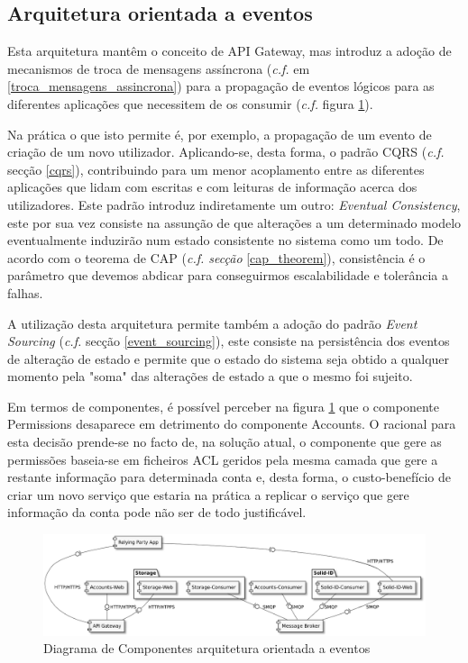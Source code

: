 \subsection{Arquitetura orientada a eventos} \label{subsection:arquitetura_2}

Esta arquitetura mantêm o conceito de API Gateway, mas introduz a adoção de mecanismos de troca de mensagens assíncrona (\emph{c.f.} em \ref{troca_mensagens_assincrona}) para a propagação de eventos lógicos para as diferentes aplicações que necessitem de os consumir (\emph{c.f.} figura \ref{component_diagram_arquitetura2}).

Na prática o que isto permite é, por exemplo, a propagação de um evento de criação de um novo utilizador. Aplicando-se, desta forma, o padrão CQRS (\emph{c.f.} secção \ref{cqrs}), contribuindo para um menor acoplamento entre as diferentes aplicações que lidam com escritas e com leituras de informação acerca dos utilizadores. Este padrão introduz indiretamente um outro: \emph{Eventual Consistency}, este por sua vez consiste na assunção de que alterações a um determinado modelo eventualmente induzirão num estado consistente no sistema como um todo. De acordo com o teorema de CAP (\emph{\emph{c.f.} secção} \ref{cap_theorem}), consistência é o parâmetro que devemos abdicar para conseguirmos escalabilidade e tolerância a falhas.

A utilização desta arquitetura permite também a adoção do padrão \emph{Event Sourcing} (\emph{c.f.} secção \ref{event_sourcing}), este consiste na persistência dos eventos de alteração de estado e permite que o estado do sistema seja obtido a qualquer momento pela "soma" das alterações de estado a que o mesmo foi sujeito.

Em termos de componentes, é possível perceber na figura \ref{component_diagram_arquitetura2} que o componente Permissions desaparece em detrimento do componente Accounts. O racional para esta decisão prende-se no facto de, na solução atual, o componente que gere as permissões baseia-se em ficheiros ACL geridos pela mesma camada que gere a restante informação para determinada conta e, desta forma, o custo-benefício de criar um novo serviço que estaria na prática a replicar o serviço que gere informação da conta pode não ser de todo justificável.

\begin{figure}[H]
    \begin{center}
    \includegraphics[width=1 \textwidth]{figures/arquitetura_2_diagrama_componentes.eps}
    \caption{Diagrama de Componentes arquitetura orientada a eventos}
    \label{component_diagram_arquitetura2}
    \end{center}
\end{figure}

